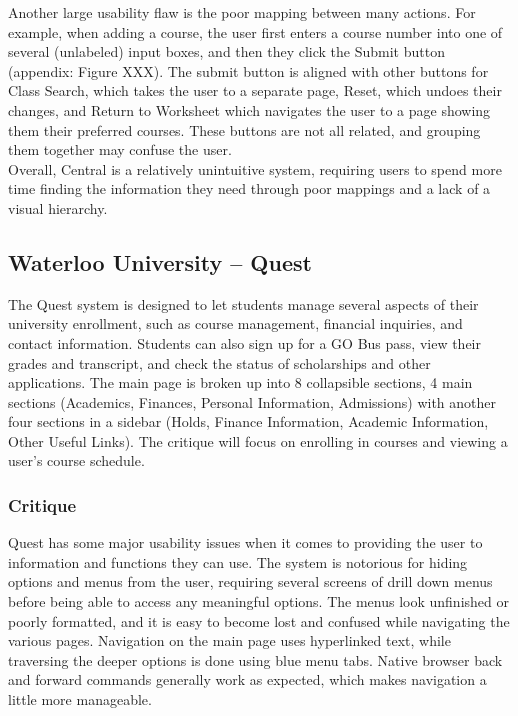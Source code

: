 \documentclass[10pt]{article}
\begin{document}
\begin{multicols}{2}
Another large usability flaw is the poor mapping between many actions. For 
example, when adding a course, the user first enters a course number into one of 
several (unlabeled) input boxes, and then they click the Submit button (appendix: 
Figure XXX). The submit button is aligned with other buttons for Class Search, 
which takes the user to a separate page, Reset, which undoes their changes, and 
Return to Worksheet which navigates the user to a page showing them their 
preferred courses. These buttons are not all related, and grouping them together 
may confuse the user.\\

Overall, Central is a relatively unintuitive system, requiring users to spend 
more time finding the information they need through poor mappings and a lack of 
a visual hierarchy.

\subsection*{Waterloo University -- Quest}
The Quest system is designed to let students manage several aspects 
of their university enrollment, such as course management, financial inquiries, 
and contact information. Students can also sign up for a GO Bus pass, view their 
grades and transcript, and check the status of scholarships and other 
applications. The main page is broken up into 8 collapsible sections, 4 main 
sections (Academics, Finances, Personal Information, Admissions) with another four 
sections in a sidebar (Holds, Finance Information, Academic Information, Other 
Useful Links). The critique will focus on enrolling in courses and viewing a 
user's course schedule.

\subsubsection*{Critique}
Quest has some major usability issues when it comes to providing the user to 
information and functions they can use. The system is notorious for hiding 
options and menus from the user, requiring several screens of drill down menus 
before being able to access any meaningful options. The menus look unfinished or 
poorly formatted, and it is easy to become lost and confused while navigating 
the various pages. Navigation on the main page uses hyperlinked text, 
while traversing the deeper options is done using blue menu tabs. Native browser 
back and forward commands generally work as expected, which makes navigation a 
little more manageable. 


\end{multicols}
\end{document}
